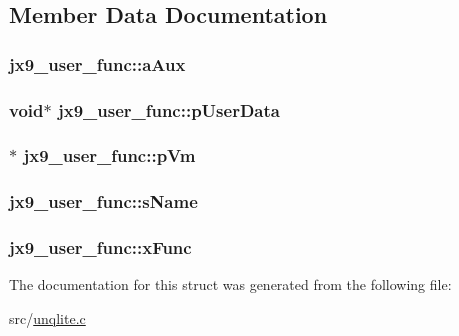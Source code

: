 \subsection{Member Data Documentation}
\hypertarget{structjx9__user__func_af7b4ddae5c686587fa9372786d632ba7}{
\subsubsection[{a\-Aux}]{ jx9\-\_\-user\-\_\-func\-::a\-Aux}}\label{d5/def/structjx9__user__func_af7b4ddae5c686587fa9372786d632ba7}
\hypertarget{structjx9__user__func_a7a0d58b59618f1473dc231d979b8da63}{
\subsubsection[{p\-User\-Data}]{\setlength{\rightskip}{0pt plus 5cm}void$\ast$ jx9\-\_\-user\-\_\-func\-::p\-User\-Data}}\label{d5/def/structjx9__user__func_a7a0d58b59618f1473dc231d979b8da63}
\hypertarget{structjx9__user__func_a73006422c356264709dfdf281055029b}{
\subsubsection[{p\-Vm}]{$\ast$ jx9\-\_\-user\-\_\-func\-::p\-Vm}}\label{d5/def/structjx9__user__func_a73006422c356264709dfdf281055029b}
\hypertarget{structjx9__user__func_a021210bf814fec1bb29833c2b7dde0ca}{
\subsubsection[{s\-Name}]{ jx9\-\_\-user\-\_\-func\-::s\-Name}}\label{d5/def/structjx9__user__func_a021210bf814fec1bb29833c2b7dde0ca}
\hypertarget{structjx9__user__func_ae470be88ef4cfb8556882f57aa0353e0}{
\subsubsection[{x\-Func}]{ jx9\-\_\-user\-\_\-func\-::x\-Func}}\label{d5/def/structjx9__user__func_ae470be88ef4cfb8556882f57aa0353e0}


The documentation for this struct was generated from the following file\-:\begin{DoxyCompactItemize}
\item 
src/\hyperlink{unqlite_8c}{unqlite.\-c}\end{DoxyCompactItemize}
